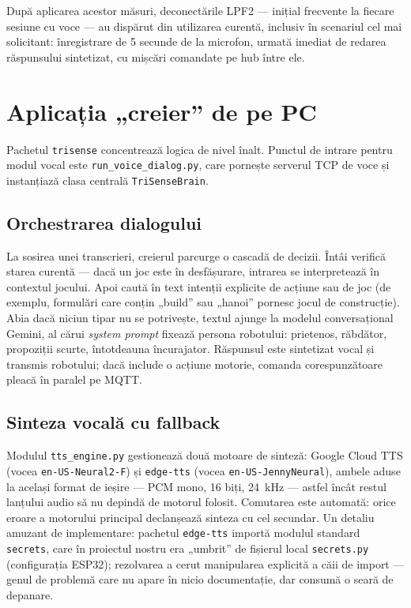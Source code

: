 După aplicarea acestor măsuri, deconectările LPF2 — inițial frecvente la fiecare sesiune cu voce — au dispărut din utilizarea curentă, inclusiv în scenariul cel mai solicitant: înregistrare de 5 secunde de la microfon, urmată imediat de redarea răspunsului sintetizat, cu mișcări comandate pe hub între ele.

\section{Aplicația „creier” de pe PC}

Pachetul \texttt{trisense} concentrează logica de nivel înalt. Punctul de intrare pentru modul vocal este \texttt{run\_voice\_dialog.py}, care pornește serverul TCP de voce și instanțiază clasa centrală \texttt{TriSenseBrain}.

\subsection{Orchestrarea dialogului}

La sosirea unei transcrieri, creierul parcurge o cascadă de decizii. Întâi verifică starea curentă — dacă un joc este în desfășurare, intrarea se interpretează în contextul jocului. Apoi caută în text intenții explicite de acțiune sau de joc (de exemplu, formulări care conțin „build” sau „hanoi” pornesc jocul de construcție). Abia dacă niciun tipar nu se potrivește, textul ajunge la modelul conversațional Gemini, al cărui \emph{system prompt} fixează persona robotului: prietenos, răbdător, propoziții scurte, întotdeauna încurajator. Răspunsul este sintetizat vocal și transmis robotului; dacă include o acțiune motorie, comanda corespunzătoare pleacă în paralel pe MQTT.

\subsection{Sinteza vocală cu fallback}

Modulul \texttt{tts\_engine.py} gestionează două motoare de sinteză: Google Cloud TTS (vocea \texttt{en-US-Neural2-F}) și \texttt{edge-tts} (vocea \texttt{en-US-JennyNeural}), ambele aduse la același format de ieșire — PCM mono, 16 biți, 24~kHz — astfel încât restul lanțului audio să nu depindă de motorul folosit. Comutarea este automată: orice eroare a motorului principal declanșează sinteza cu cel secundar. Un detaliu amuzant de implementare: pachetul \texttt{edge-tts} importă modulul standard \texttt{secrets}, care în proiectul nostru era „umbrit” de fișierul local \texttt{secrets.py} (configurația ESP32); rezolvarea a cerut manipularea explicită a căii de import — genul de problemă care nu apare în nicio documentație, dar consumă o seară de depanare.

